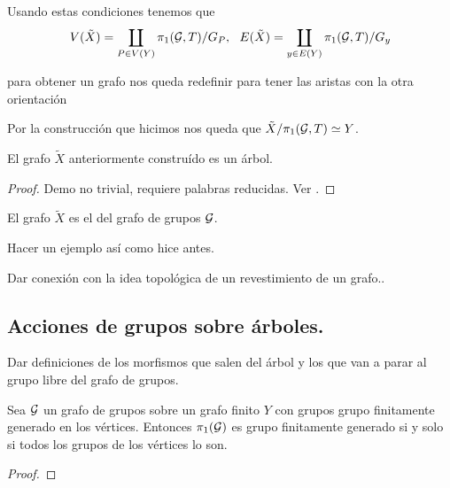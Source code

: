 \documentclass[tesis.tex]{subfiles}
\newcommand{\fg}{grupo finitamente generado }
\newcommand{\cG}{ {\cal G} }
\begin{document}
Usando estas condiciones tenemos que
\begin{equation*}
V(\tilde X) = \coprod_{P \in V(Y)} \pi_1(\cG, T) / G_P, \ \  E(\tilde X) = \coprod_{y \in E(Y)} \pi_1(\cG, T) / G_y
\end{equation*}

para obtener un grafo nos queda redefinir para tener las aristas con la otra orientación

\medskip

Por la construcción que hicimos nos queda que $\tilde X / \pi_1(\cG, T) \simeq Y$.

\begin{teo}[Serre]
	El grafo $\tilde X$ anteriormente construído es un árbol.
\end{teo}
\begin{proof}
	Demo no trivial, requiere palabras reducidas.
	Ver \cite{serre2002trees}.
\end{proof}


\begin{deff}
	El grafo $\tilde X$ es el  del grafo de grupos $\cG$.
\end{deff}

\begin{ej}
	Hacer un ejemplo así como hice antes.
\end{ej}

Dar conexión con la idea topológica de un revestimiento de un grafo..

\subsection{Acciones de grupos sobre árboles.}

Dar definiciones de los morfismos que salen del árbol y los que van a parar al grupo libre del grafo de grupos.


\begin{teo}
	Sea $\cal G$ un grafo de grupos sobre un grafo finito $Y$ con grupos \fg en los vértices.
	Entonces $\pi_1(\cal G)$ es \fg si y solo si todos los grupos de los vértices lo son.
\end{teo}

\begin{proof}
\end{proof}
\end{document}
